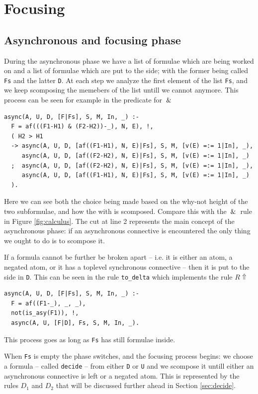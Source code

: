 \documentclass[a4paper, 12pt, english]{report}
\begin{document}
\section{Focusing}\label{sec:focusing-impl}
\subsection{Asynchronous and focusing phase}
During the asynchronous phase we have a list of formulae which are being worked on and a list of formulae which are put to the side; with the former being called \texttt{Fs} and the latter \texttt{D}.
At each step we analyze the first element of the list \texttt{Fs}, and we keep scomposing the memebers of the list untill we cannot anymore.
This process can be seen for example in the predicate for $\:\&\:$
\begin{verbatim}
async(A, U, D, [F|Fs], S, M, In, _) :-
  F = af(((F1-H1) & (F2-H2))-_), N, E), !,
  ( H2 > H1	
  -> async(A, U, D, [af((F1-H1), N, E)|Fs], S, M, [v(E) =:= 1|In], _), 
     async(A, U, D, [af((F2-H2), N, E)|Fs], S, M, [v(E) =:= 1|In], _) 
  ;  async(A, U, D, [af((F2-H2), N, E)|Fs], S, M, [v(E) =:= 1|In], _),
     async(A, U, D, [af((F1-H1), N, E)|Fs], S, M, [v(E) =:= 1|In], _)
  ).
\end{verbatim}
Here we can see both the choice being made based on the why-not height of the two subformulae, and how the with is scomposed.
Compare this with the $\:\&\:$ rule in Figure \ref{fig:calculus}.
The cut at line 2 represents the main concept of the asynchronous phase: if an asynchronous connective is encountered the only thing we ought to do is to scompose it.

If a formula cannot be further be broken apart -- i.e. it is either an atom, a negated atom, or it has a toplevel synchronous connective -- then it is put to the side in \texttt{D}.
This can be seen in the rule \texttt{to\_delta} which implements the rule $R\!\Uparrow$
\begin{verbatim}
async(A, U, D, [F|Fs], S, M, In, _) :-
  F = af((F1-_), _, _),
  not(is_asy(F1)), !,
  async(A, U, [F|D], Fs, S, M, In, _).
\end{verbatim}
This process goes as long as \texttt{Fs} has still formulae inside.

When \texttt{Fs} is empty the phase switches, and the focusing process begins: we choose a formula -- called \texttt{decide} -- from either \texttt{D} or \texttt{U} and we scompose it untill either an asynchronous connective is left or a negated atom.
This is represented by the rules $D_1$ and $D_2$ that will be discussed further ahead in Section \ref{sec:decide}.
\end{document}

